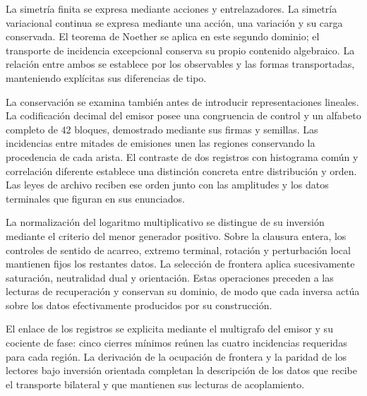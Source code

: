 La simetría finita se expresa mediante acciones y entrelazadores. La simetría variacional continua se expresa mediante una acción, una variación y su carga conservada. El teorema de Noether se aplica en este segundo dominio; el transporte de incidencia excepcional conserva su propio contenido algebraico. La relación entre ambos se establece por los observables y las formas transportadas, manteniendo explícitas sus diferencias de tipo.

La conservación se examina también antes de introducir representaciones
lineales. La codificación decimal del emisor posee una congruencia de
control y un alfabeto completo de \(42\) bloques, demostrado mediante
sus firmas y semillas. Las incidencias entre mitades de emisiones unen
las regiones conservando la procedencia de cada arista. El contraste
de dos registros con histograma común y correlación diferente establece
una distinción concreta entre distribución y orden. Las leyes de archivo
reciben ese orden junto con las amplitudes y los datos terminales
que figuran en sus enunciados.

La normalización del logaritmo multiplicativo se distingue de su
inversión mediante el criterio del menor generador positivo. Sobre la
clausura entera, los controles de sentido de acarreo, extremo terminal,
rotación y perturbación local mantienen fijos los restantes datos.
La selección de frontera aplica sucesivamente saturación, neutralidad
dual y orientación. Estas operaciones preceden a las lecturas de
recuperación y conservan su dominio, de modo que cada inversa actúa
sobre los datos efectivamente producidos por su construcción.

El enlace de los registros se explicita mediante el multigrafo del
emisor y su cociente de fase: cinco cierres mínimos reúnen las cuatro
incidencias requeridas para cada región. La derivación de la ocupación
de frontera y la paridad de los lectores bajo inversión orientada
completan la descripción de los datos que recibe el transporte bilateral
y que mantienen sus lecturas de acoplamiento.
